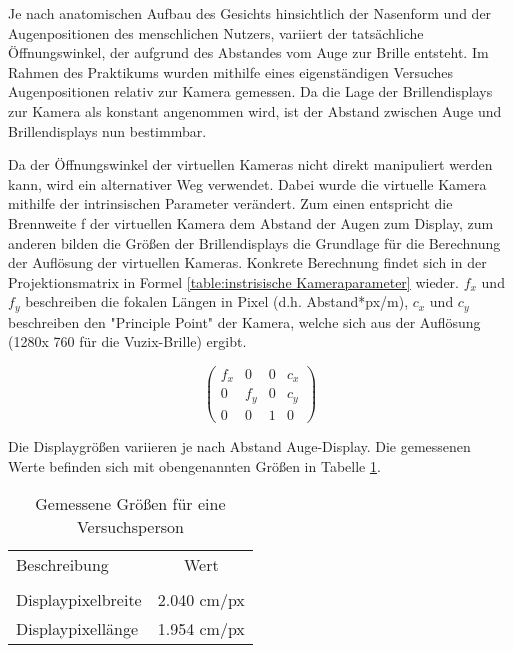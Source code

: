 Je nach anatomischen Aufbau des Gesichts hinsichtlich  der Nasenform und der Augenpositionen des menschlichen Nutzers, variiert der tatsächliche Öffnungswinkel, der aufgrund des Abstandes vom Auge zur Brille entsteht. Im Rahmen des Praktikums wurden mithilfe eines eigenständigen Versuches Augenpositionen relativ zur Kamera gemessen. Da die Lage der Brillendisplays zur Kamera als konstant angenommen wird, ist der Abstand zwischen Auge und Brillendisplays nun bestimmbar.

Da der Öffnungswinkel der virtuellen Kameras nicht direkt manipuliert werden kann, wird ein alternativer Weg verwendet. Dabei wurde die virtuelle Kamera mithilfe der intrinsischen Parameter verändert. Zum einen entspricht die Brennweite f der virtuellen Kamera dem Abstand der Augen zum Display, zum anderen bilden die Größen der Brillendisplays die Grundlage für die Berechnung der Auflösung der virtuellen Kameras. Konkrete Berechnung findet sich in der Projektionsmatrix in Formel \ref{table:instrisische Kameraparameter} wieder. $f_x$ und $f_y$ beschreiben die fokalen Längen in Pixel (d.h. Abstand*px/m), $c_x$ und $c_y$ beschreiben den "Principle Point" der Kamera, welche sich aus der Auflösung (1280x 760 für die Vuzix-Brille) ergibt. 

%

\begin{equation}
\begin{pmatrix}
f_x & 0& 0& c_x \\
0 & f_y & 0 & c_y\\ 
0 & 0&   1 & 0  
\end{pmatrix}
\label{table:instrisische Kameraparameter}
\end{equation}

Die Displaygrößen variieren je nach Abstand Auge-Display. Die gemessenen Werte befinden sich mit obengenannten Größen in Tabelle \ref{table:Messwerte DisplayAuge}.
%
 \begin{table}[ht]

 \begin{tabular}{lc} 
  Beschreibung & Wert \\ \\
  Displaypixelbreite & 2.040 cm/px \\
  Displaypixellänge &  1.954 cm/px \\
 \end{tabular}
 \caption{Gemessene Größen für eine Versuchsperson}
 \label{table:Messwerte DisplayAuge}
 \end{table}


